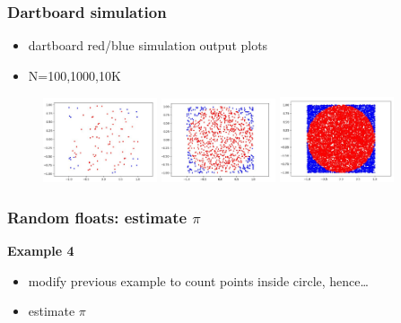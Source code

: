 \documentclass[english,14pt]{beamer}
\begin{document}
\begin{frame}[fragile]

\frametitle{Dartboard simulation}

\begin{itemize}
	\item dartboard red/blue simulation output plots
	\item N=100,1000,10K
\end{itemize}

\begin{figure}[ht]
	\centering
	\includegraphics[width=0.3\textwidth]{figures/dartboard100}%
	\includegraphics[width=0.3\textwidth]{figures/dartboard1000}%
	\includegraphics[width=0.3\textwidth]{figures/dartboard10000}
\end{figure}

\end{frame}


\begin{frame}[fragile]

\frametitle{Random floats: estimate $\pi$}

\textbf{Example 4}\\
\vspace*{5mm}
\begin{itemize}
	\item modify previous example to count points inside circle, hence\ldots
	\item estimate $\pi$
\end{itemize}

\end{frame}
\end{document}
